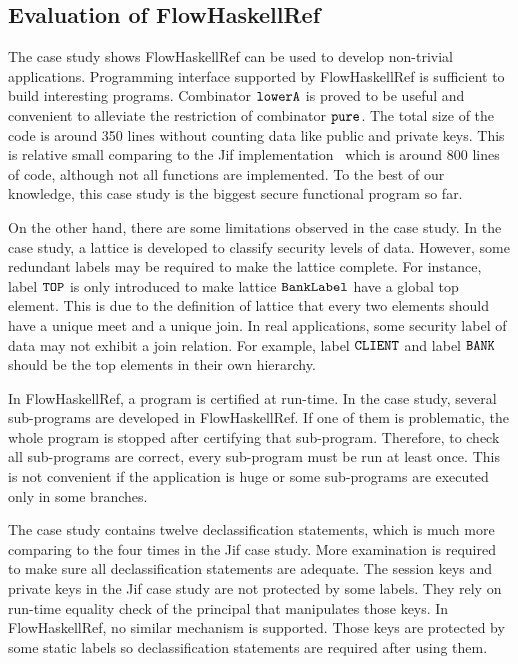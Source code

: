 \documentclass{report}
\newcommand{\co}[1]{$\cod{#1}$}
\begin{document}
\subsection{Evaluation of FlowHaskellRef}
\label{chap6:eval:flowhaskellref}
The case study shows FlowHaskellRef can be used to develop non-trivial applications. Programming
interface supported by FlowHaskellRef is sufficient to build interesting programs. Combinator \co{lowerA}
is proved to be useful and convenient to alleviate the restriction of combinator \co{pure}.
The total size of the code is around 350 lines without counting data like public and private keys.
This is relative small comparing to the Jif implementation~\cite{Tse:Washburn:jif} which is around 800 
lines of code, although not all functions are implemented. To the best of our knowledge, this case
study is the biggest secure functional program so far.

On the other hand, there are some limitations observed in the case study.
In the case study, a lattice is developed to classify security levels of data. However, some
redundant labels may be required to make the lattice complete. For instance, label \co{TOP} is
only introduced to make lattice \co{BankLabel} have a global top element. This is due to the
definition of lattice that every two elements should have a unique meet and a unique join. 
In real applications, some security label of data may not exhibit a join relation. For example, label 
\co{CLIENT} and label \co{BANK} should be the top elements in their own hierarchy. 

In FlowHaskellRef, a program is certified at run-time. In the case study, several sub-programs are developed
in FlowHaskellRef. If one of them is problematic, the whole program is stopped after certifying that sub-program. 
Therefore, to check all sub-programs are correct, every sub-program must be run at least once. This is not
convenient if the application is huge or some sub-programs are executed only in some branches.

The case study contains twelve declassification statements, which is much more comparing to the four times 
in the Jif case study. More examination is required to make sure all declassification statements are adequate.
The session keys and private keys in the Jif case study are not
protected by some labels. They rely on run-time equality check of the principal that manipulates those keys.
In FlowHaskellRef, no similar mechanism is supported. Those keys are protected by some static labels so
declassification statements are required after using them.
\end{document}
